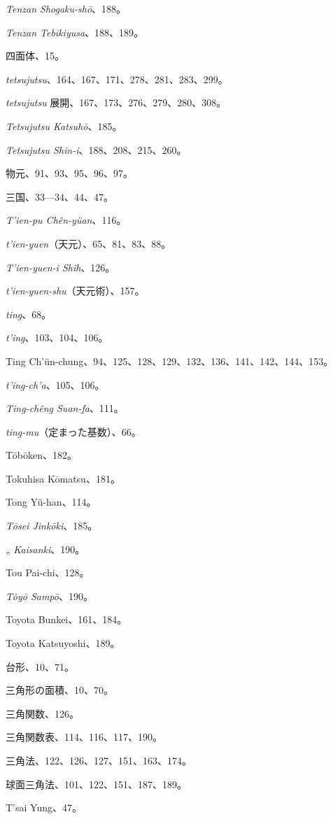 \documentclass[11pt]{article}
\newcommand{\scanpage}[2]{\clearpage\setcounter{footnote}{0}\noindent{\footnotesize\color{gray}PDF #1 頁 · #2}\par\medskip}
\begin{document}
\scanpage{0359}{印刷頁 345}
\emph{Tenzan Shogaku-shō}、188。\par
\emph{Tenzan Tebikiyusa}、188、189。\par
四面体、15。\par
\emph{tetsujutsu}、164、167、171、278、281、283、299。\par
\emph{tetsujutsu} 展開、167、173、276、279、280、308。\par
\emph{Tetsujutsu Katsuhō}、185。\par
\emph{Tetsujutsu Shin-i}、188、208、215、260。\par
物元、91、93、95、96、97。\par
三国、33—34、44、47。\par
\emph{T'ien-pu Chên-yüan}、116。\par
\emph{t'ien-yuen}（天元）、65、81、83、88。\par
\emph{T'ien-yuen-i Shih}、126。\par
\emph{t'ien-yuen-shu}（天元術）、157。\par
\emph{ting}、68。\par
\emph{t'ing}、103、104、106。\par
Ting Ch'ün-chung、94、125、128、129、132、136、141、142、144、153。\par
\emph{t'ing-ch'a}、105、106。\par
\emph{Ting-chêng Suan-fa}、111。\par
\emph{ting-mu}（定まった基数）、66。\par
Tōbōken、182。\par
Tokuhisa Kōmatsu、181。\par
Tong Yü-han、114。\par
\emph{Tōsei Jinkōki}、185。\par
\quad „ \emph{Kaisanki}、190。\par
Tou Pai-chi、128。\par
\emph{Tōyō Sampō}、190。\par
Toyota Bunkei、161、184。\par
Toyota Katsuyoshi、189。\par
台形、10、71。\par
三角形の面積、10、70。\par
三角関数、126。\par
三角関数表、114、116、117、190。\par
三角法、122、126、127、151、163、174。\par
球面三角法、101、122、151、187、189。\par
T'sai Yung、47。\par
\end{document}
